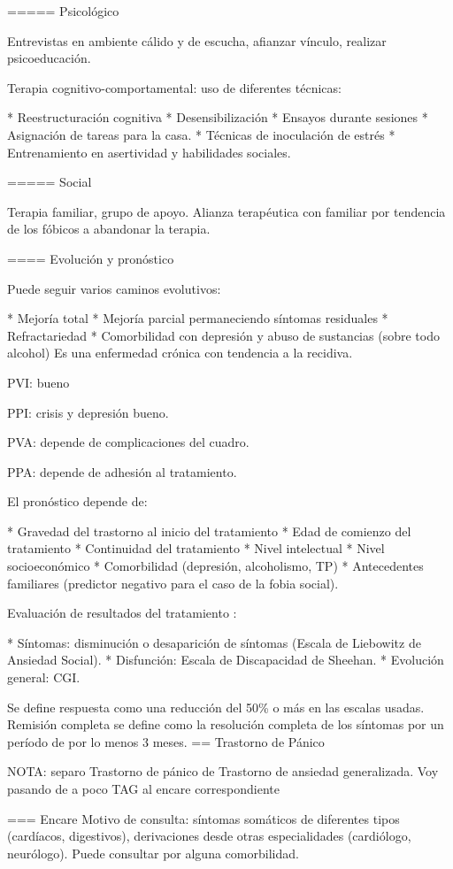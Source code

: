 \documentclass{scrbook}
\begin{document}
===== Psicológico

Entrevistas en ambiente cálido y de escucha, afianzar vínculo, realizar psicoeducación.

Terapia cognitivo-comportamental: uso de diferentes técnicas:

* Reestructuración cognitiva
* Desensibilización
* Ensayos durante sesiones
* Asignación de tareas para la casa.
* Técnicas de inoculación de estrés
* Entrenamiento en asertividad y habilidades sociales.

===== Social

Terapia familiar, grupo de apoyo. Alianza terapéutica con familiar por tendencia de los fóbicos a abandonar la terapia.

==== Evolución y pronóstico

Puede seguir varios caminos evolutivos:

* Mejoría total
* Mejoría parcial permaneciendo síntomas residuales
* Refractariedad
* Comorbilidad con depresión y abuso de sustancias (sobre todo alcohol) Es una enfermedad crónica con tendencia a la recidiva.

PVI: bueno

PPI: crisis y depresión bueno.

PVA: depende de complicaciones del cuadro.

PPA: depende de adhesión al tratamiento.

El pronóstico depende de:

* Gravedad del trastorno al inicio del tratamiento
* Edad de comienzo del tratamiento
* Continuidad del tratamiento
* Nivel intelectual
* Nivel socioeconómico
* Comorbilidad (depresión, alcoholismo, TP)
* Antecedentes familiares (predictor negativo para el caso de la fobia social).

Evaluación de resultados del tratamiento :

* Síntomas: disminución o desaparición de síntomas (Escala de Liebowitz de Ansiedad Social).
* Disfunción: Escala de Discapacidad de Sheehan.
* Evolución general: CGI.

Se define respuesta como una reducción del 50\% o más en las escalas usadas. Remisión completa se define como la resolución completa de los síntomas por un período de por lo menos 3 meses.
== Trastorno de Pánico

NOTA: separo Trastorno de pánico de Trastorno de ansiedad generalizada. Voy pasando de a poco TAG al encare correspondiente

=== Encare
Motivo de consulta: síntomas somáticos de diferentes tipos (cardíacos, digestivos), derivaciones desde otras especialidades (cardiólogo, neurólogo). Puede consultar por alguna comorbilidad.
\end{document}
